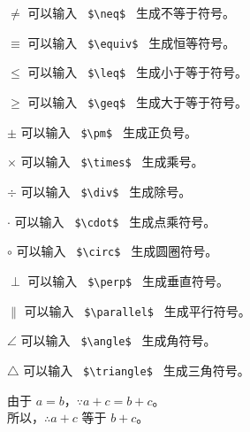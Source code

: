 \documentclass{article}
\begin{document}
\begin{CJK*}{UTF8}{gbsn}
\begin{flushleft}
		$\neq$ 可以输入 \verb | $\neq$ | 生成不等于符号。 \par
		$\equiv$ 可以输入 \verb | $\equiv$ | 生成恒等符号。 \par
		$\leq$ 可以输入 \verb | $\leq$ | 生成小于等于符号。 \par
		$\geq$ 可以输入 \verb | $\geq$ | 生成大于等于符号。 \par
		$\pm$ 可以输入 \verb | $\pm$ | 生成正负号。 \par
		$\times$ 可以输入 \verb | $\times$ | 生成乘号。 \par
		$\div$ 可以输入 \verb | $\div$ | 生成除号。 \par
		$\cdot$ 可以输入 \verb | $\cdot$ | 生成点乘符号。 \par
		$\circ$ 可以输入 \verb | $\circ$ | 生成圆圈符号。 \par
		$\perp$ 可以输入 \verb | $\perp$ | 生成垂直符号。 \par
		$\parallel$ 可以输入 \verb | $\parallel$ | 生成平行符号。 \par
		$\angle$ 可以输入 \verb | $\angle$ | 生成角符号。 \par
		$\triangle$ 可以输入 \verb | $\triangle$ | 生成三角符号。 \par
		由于 $a = b$，$\because a + c = b + c$。\\
		所以，$\therefore a + c$ 等于 $b + c$。
		\end{flushleft}

	\end{CJK*}
\end{document}
